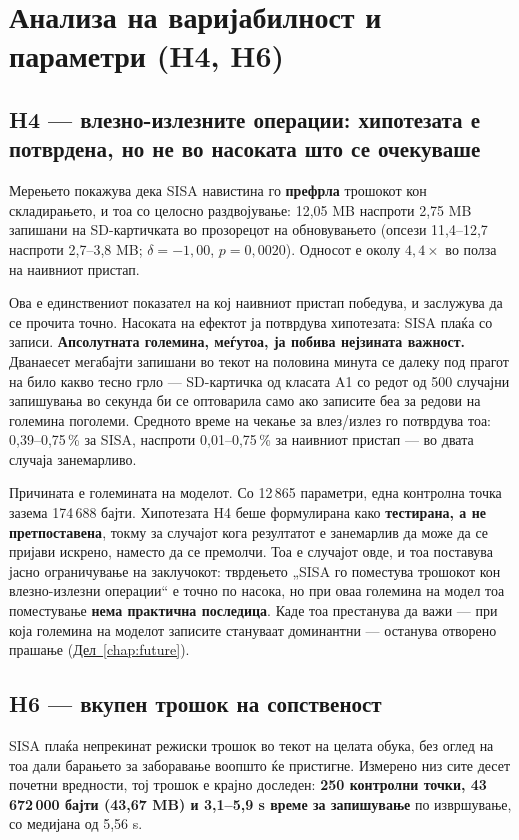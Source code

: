 \section{Анализа на варијабилност и параметри (H4, H6)}

\subsection{H4 --- влезно-излезните операции: хипотезата е потврдена, но не во насоката што се очекуваше}

Мерењето покажува дека SISA навистина го \textbf{префрла} трошокот кон складирањето, и тоа со
целосно раздвојување: 12,05 MB наспроти 2,75 MB запишани на SD-картичката во прозорецот на
обновувањето (опсези 11,4–12,7 наспроти 2,7–3,8 MB; $\delta = -1{,}00$, $p = 0{,}0020$).
Односот е околу $4{,}4\times$ во полза на наивниот пристап.

Ова е единствениот показател на кој наивниот пристап победува, и заслужува да се прочита
точно. Насоката на ефектот ја потврдува хипотезата: SISA плаќа со записи. \textbf{Апсолутната
големина, меѓутоа, ја побива нејзината важност.} Дванаесет мегабајти запишани во текот на
половина минута се далеку под прагот на било какво тесно грло --- SD-картичка од класата A1
со редот од 500 случајни запишувања во секунда би се оптоварила само ако записите беа за
редови на големина поголеми. Средното време на чекање за влез/излез го потврдува тоа:
0,39–0,75\,\% за SISA, наспроти 0,01–0,75\,\% за наивниот пристап --- во двата случаја занемарливо.

Причината е големината на моделот. Со 12\,865 параметри, една контролна точка зазема
174\,688 бајти. Хипотезата H4 беше формулирана како \textbf{тестирана, а не претпоставена}, токму
за случајот кога резултатот е занемарлив да може да се пријави искрено, наместо да се
премолчи. Тоа е случајот овде, и тоа поставува јасно ограничување на заклучокот: тврдењето
„SISA го поместува трошокот кон влезно-излезни операции“ е точно по насока, но при оваа
големина на модел тоа поместување \textbf{нема практична последица}. Каде тоа престанува да важи --- при која големина на моделот записите стануваат доминантни --- останува отворено прашање
(\hyperref[chap:future]{Дел~\ref*{chap:future}}).

\subsection{H6 --- вкупен трошок на сопственост}

SISA плаќа непрекинат режиски трошок во текот на целата обука, без оглед на тоа дали
барањето за заборавање воопшто ќе пристигне. Измерено низ сите десет почетни вредности, тој
трошок е крајно доследен: \textbf{250 контролни точки, 43\,672\,000 бајти (43,67 MB) и 3,1–5,9 s
време за запишување} по извршување, со медијана од 5,56 s.

